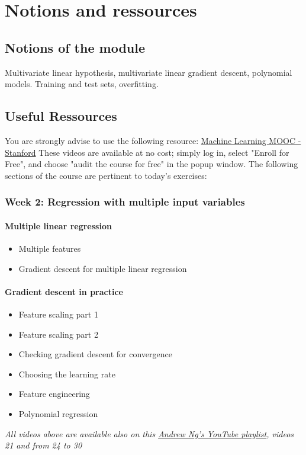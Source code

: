 

\chapter*{Notions and ressources}

\section*{Notions of the module}
Multivariate linear hypothesis, multivariate linear gradient descent, polynomial models. 
Training and test sets, overfitting.

\section*{Useful Ressources}

You are strongly advise to use the following resource:
\href{https://www.coursera.org/learn/machine-learning}{Machine Learning MOOC - Stanford}
These videos are available at no cost; simply log in, select "Enroll for Free", and choose "audit the course for free" in the popup window.
The following sections of the course are pertinent to today's exercises:

\subsection*{Week 2: Regression with multiple input variables}

\subsubsection*{Multiple linear regression}
\begin{itemize}
  \item Multiple features
  \item Gradient descent for multiple linear regression
\end{itemize}

\subsubsection*{Gradient descent in practice}
\begin{itemize}
  \item Feature scaling part 1
  \item Feature scaling part 2
  \item Checking gradient descent for convergence
  \item Choosing the learning rate
  \item Feature engineering
  \item Polynomial regression
\end{itemize}


\emph{All videos above are available also on this \href{https://youtube.com/playlist?list=PLkDaE6sCZn6FNC6YRfRQc_FbeQrF8BwGI&feature=shared}{Andrew Ng's YouTube playlist}, videos 21 and from 24 to 30}